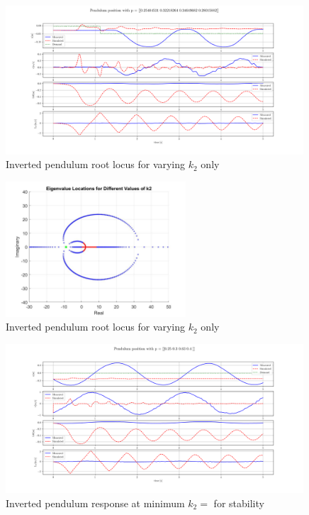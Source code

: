 \documentclass{article}
\begin{document}

\begin{figure}[H]
  \centering
  \includegraphics[width=0.99\textwidth]{figures/4.3.png}
  \caption{Inverted pendulum root locus for varying $k_2$ only}
  \label{fig:4.3}
\end{figure}


\begin{figure}[H]
  \centering
  \includegraphics[width=0.6\textwidth]{figures/4.4roots.jpg}
  \caption{Inverted pendulum root locus for varying $k_2$ only}
  \label{fig:roots4.4}
\end{figure}

\begin{figure}[H]
  \centering
  \includegraphics[width=0.99\textwidth]{figures/4.4_lo.png}
  \caption{Inverted pendulum response at minimum $k_2 = $ for stability}
  \label{fig:roots4.4_lo}
\end{figure}
\end{document}
